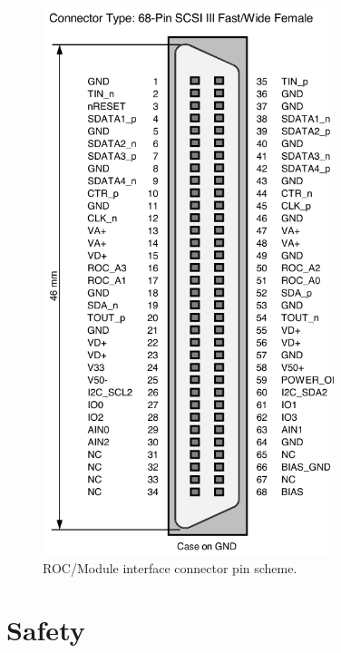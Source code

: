 \begin{figure}[hbtp]
    \begin{center}
	\includegraphics[width=85mm]{img/DTB_adapterplug.pdf}
	\caption{ROC/Module interface connector pin scheme.}
	\label{fig:ROCmoduleInterfaceConnector}
    \end{center}
\end{figure}

\section{Safety} \label{sec:tbsafety}

